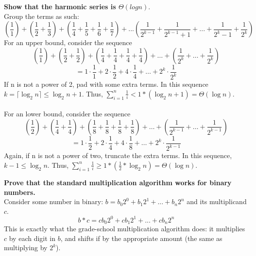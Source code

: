 \begin{problem}{1.5}
    \textbf{Show that the harmonic series is $\Theta(log n)$}.
    \\
    Group the terms as such:
    \[
        \left(\frac{1}{1}\right) + \left(\frac{1}{2} + \frac{1}{3}\right) + \left(\frac{1}{4} + \frac{1}{5} + \frac{1}{6} + \frac{1}{7}\right) + ... \left(\frac{1}{2^{k - 1}} + \frac{1}{2^{k - 1} + 1} + ... + \frac{1}{2^k - 1} + \frac{1}{2^k}\right)
    \]
    For an upper bound, consider the sequence
    \[
         \left(\frac{1}{1}\right) + \left(\frac{1}{2} + \frac{1}{2}\right) + \left(\frac{1}{4} + \frac{1}{4} + \frac{1}{4} + \frac{1}{4}\right) + \ldots + \left(\frac{1}{2^k} + \ldots + \frac{1}{2^k}\right)
    \]
    \[
         = 1\cdot\frac{1}{1} + 2\cdot\frac{1}{2} + 4\cdot\frac{1}{4} + \ldots + 2^k\cdot\frac{1}{2^k} 
    \]
    If n is not a power of 2, pad with some extra terms. In this sequence $k = \lceil \log_2n \rceil \leq \log_2n + 1$. Thus, $\sum_{i=1}^{n} \frac{1}{i} < 1 * (\log_2n + 1) = \Theta(\log n)$.
    \\ \\
     For an lower bound, consider the sequence
    \[
         \left(\frac{1}{2}\right) + \left(\frac{1}{4} + \frac{1}{4}\right) + \left(\frac{1}{8} + \frac{1}{8} + \frac{1}{8} + \frac{1}{8}\right) + \ldots +  \left(\frac{1}{2^{k - 1}} + \ldots + \frac{1}{2^{k - 1}}\right)
    \]
    \[
         = 1\cdot\frac{1}{2} + 2\cdot\frac{1}{4} + 4\cdot\frac{1}{8} + \ldots + 2^k\cdot\frac{1}{2^{k - 1}} 
    \]
    Again, if n is not a power of two, truncate the extra terms. In this sequence, $k - 1 \leq \log_2 n$. Thus, $\sum_{i=1}^{n} \frac{1}{i} \geq 1 * (\frac{1}{2} * \log_2n) = \Theta(\log n)$.
\end{problem}

\begin{problem}{1.6}
    \textbf{Prove that the standard multiplication algorithm works for binary numbers.}
    \\
    Consider some number in binary: $b = b_0 2^0 + b_1 2^1 + ... + b_n 2^n$ and its multiplicand $c$. 
    \[
         b * c = c b_0 2^0 + c b_1 2^1 + ... + c b_n 2^n
    \]
    This is exactly what the grade-school multiplication algorithm does: it multiplies $c$ by each digit in $b$, and shifts if by the appropriate amount (the same as multiplying by $2^k$).
\end{problem}

